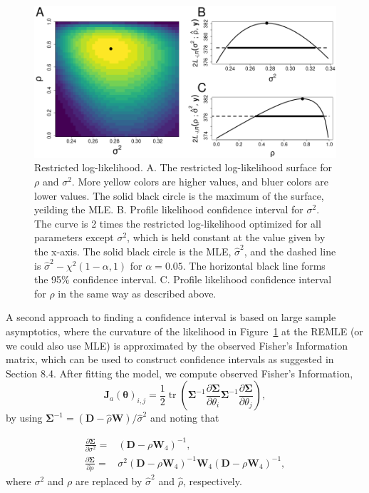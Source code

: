 \documentclass[12pt, titlepage]{article}
\begin{document}
\begin{figure}[H]
  \begin{center}
	    \includegraphics[width=1\linewidth]{Seals_logLik}
  \end{center}
  \caption{Restricted log-likelihood.  A. The restricted log-likelihood surface for $\rho$ and $\sigma^{2}$.  More yellow colors are higher values, and bluer colors are lower values.  The solid black circle is the maximum of the surface, yeilding the MLE. B. Profile likelihood confidence interval for $\sigma^{2}$. The curve is 2 times the restricted log-likelihood optimized for all parameters except $\sigma^{2}$, which is held constant at the value given by the x-axis.  The solid black circle is the MLE, $\hat{\sigma}^{2}$, and the dashed line is $\hat{\sigma}^{2} - \chi^{2}(1-\alpha,1)$ for $\alpha = 0.05$.  The horizontal black line forms the 95\% confidence interval.  C. Profile likelihood confidence interval for $\rho$ in the same way as described above. \label{Fig:Seals_logLik}}
\end{figure}


A second approach to finding a confidence interval is based on large sample asymptotics, where the curvature of the likelihood in Figure~\ref{Fig:Seals_logLik} at the REMLE (or we could also use MLE) is approximated by the observed Fisher's Information matrix, which can be used to construct confidence intervals as suggested in Section 8.4.  After fitting the model, we compute observed Fisher's Information,
$$
\boldsymbol{J}_{a}{(\boldsymbol{\theta})_{i,j}} = \frac{1}{2}\operatorname{tr}\left(\boldsymbol{\Sigma}^{-1} \frac{\partial \boldsymbol{\Sigma}}{\partial\theta_i}{\boldsymbol{\Sigma}^{-1}}\frac{\partial\boldsymbol{\Sigma}}{\partial\theta_j}\right),
$$
by using $\boldsymbol{\Sigma}^{-1} = (\mathbf{D} - \hat{\rho}\mathbf{W})/\hat{\sigma}^{2}$ and noting that 

\begin{align*}
	\frac{\partial \boldsymbol{\Sigma}}{\partial\sigma^{2}} = & (\mathbf{D} - \rho\mathbf{W}_{4})^{-1}, \\
	\frac{\partial \boldsymbol{\Sigma}}{\partial\rho} = & \sigma^{2}(\mathbf{D} - \rho\mathbf{W}_{4})^{-1}\mathbf{W}_{4}(\mathbf{D} - \rho\mathbf{W}_{4})^{-1},
\end{align*}
where $\sigma^{2}$ and $\rho$ are replaced by $\hat{\sigma}^{2}$ and $\hat{\rho}$, respectively. 
\end{document}
